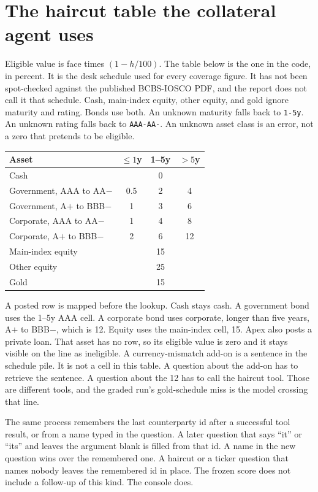 \documentclass[11pt,a4paper]{article}
\begin{document}
\section{The haircut table the collateral agent uses}

Eligible value is face times $(1-h/100)$. The table below is the one in the code, in percent. It is the desk schedule used for every coverage figure. It has not been spot-checked against the published BCBS-IOSCO PDF, and the report does not call it that schedule. Cash, main-index equity, other equity, and gold ignore maturity and rating. Bonds use both. An unknown maturity falls back to \texttt{1-5y}. An unknown rating falls back to \texttt{AAA-AA-}. An unknown asset class is an error, not a zero that pretends to be eligible.

\begin{center}
\small
\begin{tabular}{@{}lccc@{}}
\toprule
Asset & $\le 1$y & 1--5y & $>5$y \\
\midrule
Cash & \multicolumn{3}{c}{0} \\
Government, AAA to AA$-$ & 0.5 & 2 & 4 \\
Government, A$+$ to BBB$-$ & 1 & 3 & 6 \\
Corporate, AAA to AA$-$ & 1 & 4 & 8 \\
Corporate, A$+$ to BBB$-$ & 2 & 6 & 12 \\
Main-index equity & \multicolumn{3}{c}{15} \\
Other equity & \multicolumn{3}{c}{25} \\
Gold & \multicolumn{3}{c}{15} \\
\bottomrule
\end{tabular}
\end{center}

A posted row is mapped before the lookup. Cash stays cash. A government bond uses the 1--5y AAA cell. A corporate bond uses corporate, longer than five years, A$+$ to BBB$-$, which is 12. Equity uses the main-index cell, 15. Apex also posts a private loan. That asset has no row, so its eligible value is zero and it stays visible on the line as ineligible. A currency-mismatch add-on is a sentence in the schedule pile. It is not a cell in this table. A question about the add-on has to retrieve the sentence. A question about the 12 has to call the haircut tool. Those are different tools, and the graded run's gold-schedule miss is the model crossing that line.

The same process remembers the last counterparty id after a successful tool result, or from a name typed in the question. A later question that says ``it'' or ``its'' and leaves the argument blank is filled from that id. A name in the new question wins over the remembered one. A haircut or a ticker question that names nobody leaves the remembered id in place. The frozen score does not include a follow-up of this kind. The console does.
\end{document}
